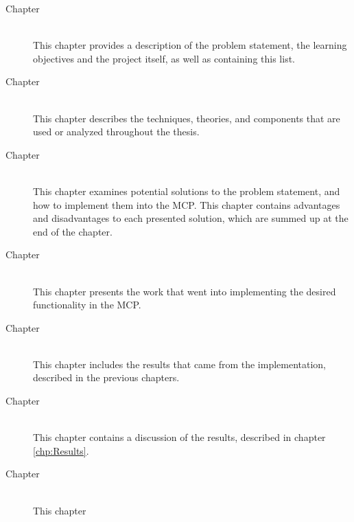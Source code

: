 \begin{description}
	\item[Chapter ]\ \\
	This chapter provides a description of the problem statement, the learning objectives and the project itself, as well as containing this list.
	\item[Chapter ]\ \\
	This chapter describes the techniques, theories, and components that are used or analyzed throughout the thesis.
	\item[Chapter ]\ \\
	This chapter examines potential solutions to the problem statement, and how to implement them into the MCP. This chapter contains advantages and disadvantages to each presented solution, which are summed up at the end of the chapter.
	\item[Chapter ]\ \\
	This chapter presents the work that went into implementing the desired functionality in the MCP.
	\item[Chapter ]\ \\
	This chapter includes the results that came from the implementation, described in the previous chapters.
	\item[Chapter ]\ \\
	This chapter contains a discussion of the results, described in chapter \ref{chp:Results}.
	\item[Chapter ]\ \\
	This chapter
\end{description}